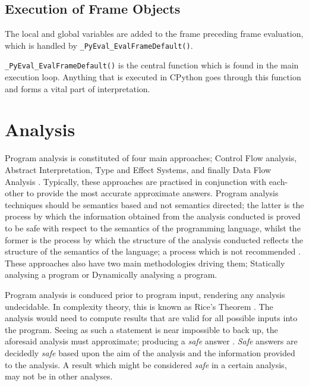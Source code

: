 \documentclass[12pt, a4paper]{report}
\theoremstyle{definition}
\theoremstyle{definition}%
\theoremstyle{definition}%
\theoremstyle{definition}%
\theoremstyle{definition}%
\theoremstyle{definition}%
\begin{document}
{        \subsection{Execution of Frame Objects}
        \par The local and global variables are added to the frame preceding frame evaluation, which is handled by \lstinline|_PyEval_EvalFrameDefault()|. 
        \par\lstinline|_PyEval_EvalFrameDefault()| is the central function which is found in the main execution loop. Anything that is executed in CPython goes through
        this function and forms a vital part of interpretation.
    
    \section{Analysis}
    \par Program analysis is constituted of four main approaches; Control Flow analysis, Abstract Interpretation, Type and Effect Systems, and finally Data Flow 
    Analysis \cite[pp.1--2]{nielson2004principlesofPA}. Typically, these approaches are practised in conjunction with each-other to provide the most accurate approximate answers.
    Program analysis techniques should be semantics based and not semantics directed; the latter is the process by which the information obtained from the analysis conducted is proved
    to be safe with respect to the semantics of the programming language, whilst the former is the process by which the structure of the analysis conducted reflects the structure of the semantics of the language; a process which is 
    not recommended \cite[pp.2--3]{nielson2004principlesofPA}. These approaches also have two main methodologies driving them; Statically analysing a program or Dynamically analysing a program.
    \par Program analysis is conduced prior to program input, rendering any analysis undecidable. In complexity theory, this is known as Rice's Theorem \cite{rice1953classes}. The analysis would need to compute results that are valid for 
    all possible inputs into the program. Seeing as such a statement is near impossible to back up, the aforesaid analysis must approximate; producing a \textit{safe} answer \cite[pp.9--11]{andersen1994program}. \textit{Safe} answers are decidedly
    \textit{safe} based upon the aim of the analysis and the information provided to the analysis. A result which might be considered \textit{safe} in a certain analysis, may not be in other analyses.


}
\end{document}
